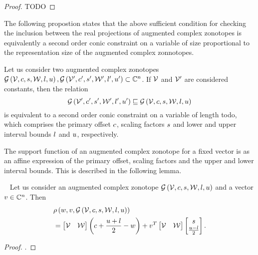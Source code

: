 %
\begin{proof}
  {\color{red} TODO}
\end{proof}
%
The following propostion states that the above sufficient condition
for checking the inclusion between the real projections of augmented
complex zonotopes is equivalently a second order conic constraint on a
variable of size proportional to the representation size of the
augmented complex zonnotopes.
%
\begin{proposition}
Let us consider two augmented complex zonotopes\\
$\mathcal{G}\left(\mathcal{V},c,s,\mathcal{W},l,u\right),
\mathcal{G}\left(\mathcal{V}^\prime,c^\prime,s^\prime,\mathcal{W}^\prime,l^\prime,u^\prime\right)\subset\mathbb{C}^n$.
If $\mathcal{V}$ and $\mathcal{V}^\prime$ are considered constants, then the
relation
%
\[
\mathcal{G}\left(\mathcal{V}^\prime,c^\prime,s^\prime,\mathcal{W}^\prime,l^\prime,u^\prime\right) \sqsubseteq
 \mathcal{G}\left(\mathcal{V},c,s,\mathcal{W},l,u\right)
\]
%
is equivalent to a second order conic constraint on a variable of
length {\color{red} todo}, which comprises the primary offset $c$, scaling
factors $s$ and lower and upper interval bounds $l$ and $u$,
respectively.
\end{proposition}
%
The support function of an augmented complex zonotope for a fixed
vector is as an affine expression of the primary offset, scaling
factors and the upper and lower interval bounds.  This is described in
the following lemma.
%
\begin{lemma}~\label{lem:support-acz}
Let us consider an augmented complex zonotope
$\mathcal{G}\left(\mathcal{V},c,s,\mathcal{W},l,u\right)$ and a vector
$v\in\mathbb{C}^n$.  Then
%
\begin{align*}
  & \rho\left(w,v,\mathcal{G}\left(\mathcal{V},c,s,\mathcal{W},l,u\right)\right)\\
  & = \left[\begin{matrix}\mathcal{V} &
    \mathcal{W}\end{matrix}\right]\left(c+\frac{u+l}{2}-w\right)+v^T\left[\begin{matrix}\mathcal{V} & \mathcal{W}\end{matrix}\right]\left[\begin{matrix}s\\\frac{u-l}{2}\end{matrix}\right].
\end{align*}
%
\end{lemma}
%
\begin{proof}
{\color{red} }.
\end{proof}
%


